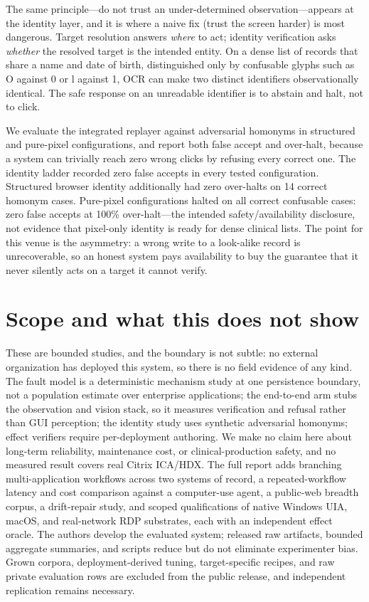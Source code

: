 \documentclass[10pt]{article}
\begin{document}
The same principle---do not trust an under-determined observation---appears at the
identity layer, and it is where a naive fix (trust the screen harder) is most
dangerous. Target resolution answers \emph{where} to act; identity verification
asks \emph{whether} the resolved target is the intended entity. On a dense list of
records that share a name and date of birth, distinguished only by confusable
glyphs such as O against 0 or l against 1, OCR can make two distinct identifiers
observationally identical. The safe response on an unreadable identifier is to
abstain and halt, not to click.

We evaluate the integrated replayer against adversarial homonyms in structured and
pure-pixel configurations, and report both false accept and over-halt, because a
system can trivially reach zero wrong clicks by refusing every correct one. The
identity ladder recorded zero false accepts in every tested configuration.
Structured browser identity additionally had zero over-halts on 14 correct homonym
cases. Pure-pixel configurations halted on all correct confusable cases: zero
false accepts at 100\% over-halt---the intended safety/availability disclosure,
not evidence that pixel-only identity is ready for dense clinical lists. The
point for this venue is the asymmetry: a wrong write to a look-alike record is
unrecoverable, so an honest system pays availability to buy the guarantee that it
never silently acts on a target it cannot verify.

\section{Scope and what this does not show}
\label{sec:scope}

These are bounded studies, and the boundary is not subtle: no external
organization has deployed this system, so there is no field evidence of any
kind. The fault model is a deterministic mechanism study at
one persistence boundary, not a population estimate over enterprise applications;
the end-to-end arm stubs the observation and vision stack, so it measures
verification and refusal rather than GUI perception;
the identity study uses synthetic adversarial homonyms; effect verifiers require
per-deployment authoring. We make no claim here about long-term reliability,
maintenance cost, or clinical-production safety, and no measured result covers
real Citrix ICA/HDX. The full report adds branching multi-application workflows
across two systems of record, a repeated-workflow latency and cost
comparison against a computer-use agent, a public-web breadth corpus, a
drift-repair study, and scoped qualifications of native Windows UIA, macOS, and
real-network RDP substrates, each with an independent effect oracle. The authors
develop the evaluated system; released raw artifacts, bounded aggregate
summaries, and scripts reduce but do not eliminate experimenter bias. Grown
corpora, deployment-derived tuning, target-specific recipes, and raw private
evaluation rows are excluded from the public release, and independent
replication remains necessary.
\end{document}
